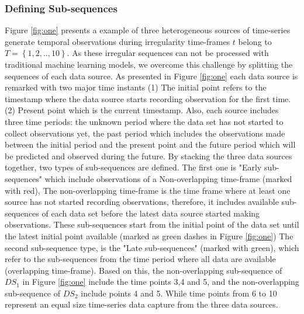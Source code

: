 \documentclass[conference]{IEEEtran}
\begin{document}
  
\subsubsection{Defining Sub-sequences}
Figure \ref{fig:one} presents a example of three heterogeneous sources of time-series generate temporal observations during irregularity time-frames $t$ belong to  $T = \left \{ 1, 2, .. ,10 \right \}$. As these irregular sequences can not be processed with traditional machine learning models, we overcome this challenge by splitting the sequences of each data source.  As presented in Figure \ref{fig:one}  each data source is remarked with two major time instants (1) The initial point refers to the timestamp where the data source starts recording observation for the first time. (2) Present point which is the current timestamp. Also, each source includes three time periods:  the unknown period where the data set has not started to collect observations yet, the past period which includes the observations made between the initial period and the present point and the future period which will be predicted and observed during the future. By stacking the three data sources together,  two types of sub-sequences are defined. The first one is "Early sub-sequences" which include observations of a Non-overlapping time-frame (marked with red), The non-overlapping time-frame is the time frame where at least one source has not started recording observations, therefore, it includes available sub-sequences of each data set before the latest data source started making observations. These sub-sequences start from the initial point of the data set until the latest initial point available (marked as green dashes in Figure \ref{fig:one}) The second sub-sequence type, is the "Late sub-sequences" (marked with green), which refer to the sub-sequences from the time period where all data are available (overlapping time-frame). Based on this, the non-overlapping sub-sequence of $DS_{1}$ in  Figure \ref{fig:one} include the time points 3,4 and 5, and the non-overlapping sub-sequence of  $DS_{2}$ include points 4 and 5. While time points from 6 to 10 represent an equal size time-series data capture from the three data sources.
\end{document}
